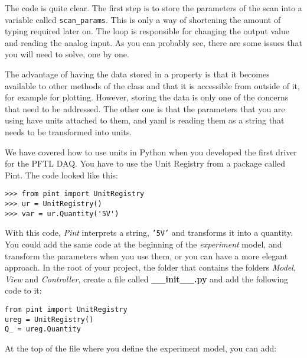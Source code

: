 The code is quite clear. The first step is to store the parameters of
the scan into a variable called \texttt{scan_params}. This is only a
way of shortening the amount of typing required later on. The loop is
responsible for changing the output value and reading the analog input.
As you can probably see, there are some issues that you will need to
solve, one by one.


The advantage of having the data stored in a property is that it
becomes available to other methods of the class and that it is
accessible from outside of it, for example for plotting. However,
storing the data is only one of the concerns that need to be addressed.
The other one is that the parameters that you are using have units
attached to them, and yaml is reading them as a string that needs to be
transformed into units.

We have covered how to use units in Python when you developed the first
driver for the {PFTL} {DAQ}. You have to use the Unit Registry from a
package called Pint. The code looked like this:

\begin{verbatim}
>>> from pint import UnitRegistry
>>> ur = UnitRegistry()
>>> var = ur.Quantity('5V')
\end{verbatim}

With this code, \emph{Pint} interprets a string,
\texttt{'5V'} and transforms it into a
quantity. You could add the same code at the beginning of the
\emph{experiment} model, and transform the parameters when you use them,
or you can have a more elegant approach. In the root of your project,
the folder that contains the folders \emph{Model}, \emph{View} and
\emph{Controller}, create a file called \textbf{\_\_init\_\_.py} and add
the following code to it:

\begin{verbatim}
from pint import UnitRegistry
ureg = UnitRegistry()
Q_ = ureg.Quantity
\end{verbatim}

At the top of the file where you define the experiment model, you
can add:


